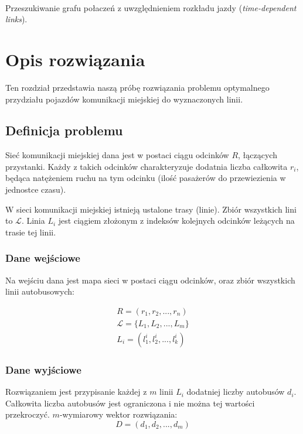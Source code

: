 \documentclass[polish,12pt]{aghthesis}
\begin{document}
\paragraph{\cite{bib-theoretical-framework}}
Przeszukiwanie grafu połaczeń z uwzględnieniem rozkładu jazdy (\textit{time-dependent links}).

\newpage




\section{Opis rozwiązania} \label{sec:solution}
Ten rozdział przedstawia naszą próbę rozwiązania problemu optymalnego przydziału pojazdów komunikacji miejskiej do wyznaczonych linii.

\subsection{Definicja problemu}
Sieć komunikacji miejskiej dana jest w postaci ciągu odcinków $R$, łączących przystanki. Każdy z takich odcinków charakteryzuje dodatnia liczba całkowita $r_i$, będąca natężeniem ruchu na tym odcinku (ilość pasażerów do przewiezienia w jednostce czasu).

W sieci komunikacji miejskiej istnieją ustalone trasy (linie). Zbiór wszystkich lini to $\mathcal{L}$. Linia $L_i$ jest ciągiem złożonym z indeksów kolejnych odcinków leżących na trasie tej linii.

\subsubsection{Dane wejściowe}
Na wejściu dana jest mapa sieci w postaci ciągu odcinków, oraz zbiór wszystkich linii autobusowych:

\begin{eqnarray}
R = (r_1, r_2, ..., r_n) \nonumber \\
\mathcal{L} = \{L_1, L_2, ..., L_m\} \\
L_i = (l_1^i, l_2^i, ..., l_k^i) \nonumber
\end{eqnarray}

\subsubsection{Dane wyjściowe}
Rozwiązaniem jest przypisanie każdej z $m$ linii $L_i$ dodatniej liczby autobusów $d_i$. Całkowita liczba autobusów jest ograniczona i nie można tej wartości przekroczyć. $m$-wymiarowy wektor rozwiązania:
\begin{equation}
D = (d_1, d_2, ..., d_m)
\end{equation}
\end{document}
